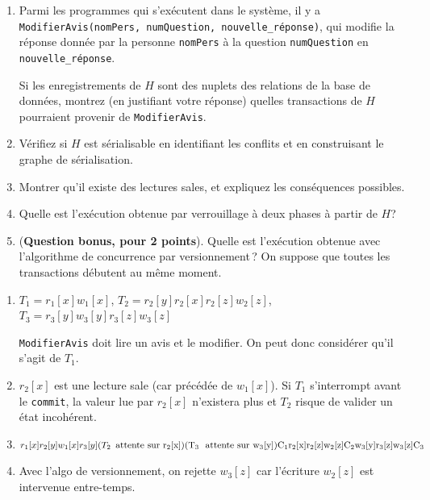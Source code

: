 \begin{enumerate}
  \item Parmi les programmes qui s'exécutent dans le système, 
il y a \texttt{ModifierAvis(nomPers, numQuestion, nouvelle\_réponse)},  qui modifie 
la réponse donnée par
la personne \texttt{nomPers} à  la question \texttt{numQuestion} 
en \texttt{nouvelle\_réponse}. 

Si
les enregistrements de $H$ sont des nuplets des relations de la base 
de données, montrez (en justifiant votre réponse)
quelles transactions de $H$ pourraient provenir de \texttt{ModifierAvis}.



  \item Vérifiez si $H$ est sérialisable en identifiant 
les conflits et en construisant le graphe de sérialisation.

  \item Montrer qu'il existe des lectures sales, 
    et expliquez les conséquences possibles.
 
  \item  Quelle est l'exécution obtenue par verrouillage 
 à deux phases à partir de $H$? 

  \item (\textbf{Question bonus, pour 2 points}). Quelle est l'exécution obtenue avec
    l'algorithme de concurrence par versionnement\,?
         On suppose que toutes les transactions débutent
       au même moment.

\end{enumerate}


\begin{solution}

\begin{enumerate}
  \item $T_1 = r_1[x] w_1[x]$, $T_2 = r_2[y] r_2[x] r_2[z] w_2[z]$,
           $T_3 = r_3[y] w_3[y] r_3[z] w_3[z]$  
           
           \texttt{ModifierAvis} doit lire un avis et 
           le modifier. On peut donc considérer qu'il s'agit de $T_1$.

   \item $r_2[x]$ est une lecture sale (car précédée de $w_1[x]$). 
   Si $T_1$ s'interrompt avant le \texttt{commit}, la valeur
   lue par $r_2[x]$ n'existera plus et $T_2$  risque de 
   valider un état incohérent.

   \item $r_1[x] r_2[y] w_1[x] r_3[y] (T_2\,\ \rm{attente\ sur }\ r_2[x]) (T_3\ \rm{\ attente\ sur\ }w_3[y])
      C_1 r_2[x] r_2[z] w_2[z] C_2 w_3[y] r_3[z] w_3[z] C_3$

   \item Avec l'algo de versionnement, on rejette $w_3[z]$ 
    car l'écriture $w_2[z]$ est intervenue entre-temps.
\end{enumerate}

\end{solution}

